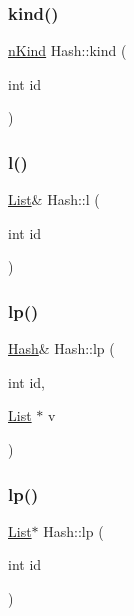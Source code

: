 \mbox{\label{classHash_a2bda97917ff3acb69ff3cc18616e13f0}} 
\subsubsection{\texorpdfstring{kind()}{kind()}}
{\footnotesize\ttfamily \mbox{\hyperlink{Node_8h_a0ec4934d366e0d191f86c6ca9c1a922f}{n\+Kind}} Hash\+::kind (\begin{DoxyParamCaption}\item[{int}]{id }\end{DoxyParamCaption})}

\mbox{\label{classHash_a130b1cdaf17b474fbb43f6534a9b93f9}} 
\subsubsection{\texorpdfstring{l()}{l()}}
{\footnotesize\ttfamily \mbox{\hyperlink{classList}{List}}\& Hash\+::l (\begin{DoxyParamCaption}\item[{int}]{id }\end{DoxyParamCaption})}

\mbox{\label{classHash_a623be7d965b4d39b0094cead21870371}} 
\subsubsection{\texorpdfstring{lp()}{lp()}\hspace{0.1cm}{\footnotesize\ttfamily [1/2]}}
{\footnotesize\ttfamily \mbox{\hyperlink{classHash}{Hash}}\& Hash\+::lp (\begin{DoxyParamCaption}\item[{int}]{id,  }\item[{\mbox{\hyperlink{classList}{List}} $\ast$}]{v }\end{DoxyParamCaption})}

\mbox{\label{classHash_abb8fdac7c0c4e3e7853f8f6b453ecc2f}} 
\subsubsection{\texorpdfstring{lp()}{lp()}\hspace{0.1cm}{\footnotesize\ttfamily [2/2]}}
{\footnotesize\ttfamily \mbox{\hyperlink{classList}{List}}$\ast$ Hash\+::lp (\begin{DoxyParamCaption}\item[{int}]{id }\end{DoxyParamCaption})}

